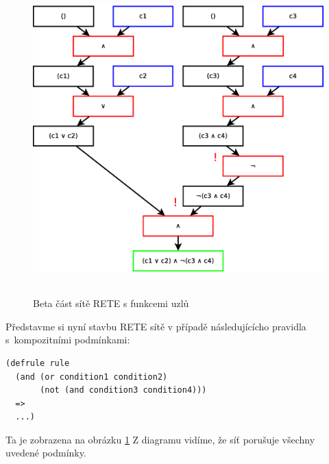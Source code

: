 \begin{figure}[h]
\centering
\includegraphics[height=12cm]{rete-beta-comp-conds.eps}
\caption{Beta část sítě RETE s funkcemi uzlů}
\label{rete-beta-comp-conds}
\end{figure}

Představme si nyní stavbu RETE sítě v případě následujícícho pravidla
s~kompozitními podmínkami:
\begin{verbatim}
(defrule rule
  (and (or condition1 condition2)
       (not (and condition3 condition4)))
  =>
  ...)
\end{verbatim}
Ta je zobrazena na obrázku \ref{rete-beta-comp-conds} Z diagramu vidíme, že síť porušuje všechny
uvedené podmínky.

